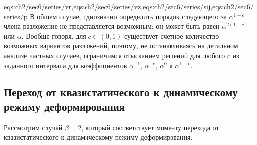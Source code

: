 \expandafter\gdef\csname eqs:ch2/sec6/series\endcsname{eqs:ch2/sec6/series/vr,eqs:ch2/sec6/series/vz,eqs:ch2/sec6/series/sij,eqs:ch2/sec6/series/p}
В общем случае, однозначно определить порядок следующего за $\alpha^{1-c}$ члена разложение не представляется возможным: он может быть равен $\alpha^{2(1-c)}$ или $\alpha$. Вообще говоря, для $c\in(0,1)$ существует счетное количество возможных вариантов разложений, поэтому, не останавливаясь на детальном анализе частных случаев, ограничимся отысканием решений для любого $c$ из заданного интервала для коэффициентов $\alpha^{-1}$, $\alpha^{-c}$, $\alpha^0$ и $\alpha^{1-c}$.
\subsection{Переход от квазистатического к динамическому режиму деформирования}\label{subsec:ch2/sec6/sub1}

Рассмотрим случай $\beta=2$, который соответствует моменту перехода от квазистатического к динамическому режиму деформирования.

